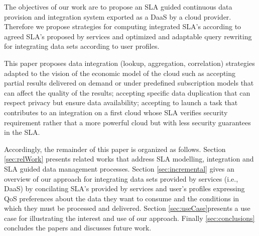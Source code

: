 The objectives of our work are to propose an SLA guided continuous data provision and integration system exported as a DaaS by a cloud provider. 
Therefore we propose strategies for computing integrated SLA’s according to agreed SLA’s proposed by services and optimized and adaptable query rewriting for integrating data sets  according to user profiles. 

This paper proposes data integration (lookup, aggregation, correlation) strategies adapted to the vision of the economic model of the cloud such as accepting partial results delivered on demand or under predefined subscription models that can affect the quality of the results; accepting specific data duplication that can respect privacy but ensure data availability; accepting to launch a task that contributes to an integration on a first cloud whose SLA verifies security requirement rather that a more powerful cloud but with less security guarantees in the SLA. 

Accordingly, the remainder of this paper is organized as follows. Section \ref{sec:relWork} presents related works that address SLA modelling, integration and SLA guided data management processes. Section \ref{sec:incremental} gives an overview of our approach for integrating data sets provided by services (i.e., DaaS) by concilating SLA's provided by services and user's profiles expressing QoS preferences about the data they want to consume and the conditions in which they must be processed and delivered. 
Section \ref{sec:useCase}presents a use case for illustrating the interest and use of our approach. Finally \ref{sec:conclusions} concludes the papers and discusses future work.